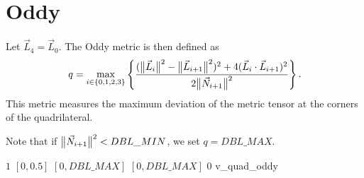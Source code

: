 \section{Oddy}

Let $\vec L_4 = \vec L_0$. The Oddy metric is then defined as
\[
q = \max_{i\in\{0,1,2,3\}}\left\{
    \frac{(\big\lVert{\vec L_i}\big\rVert^2 - \big\lVert{\vec L_{i+1}}\big\rVert^2)^2 
    + 4 (\vec L_i \cdot \vec L_{i+1})^2}
    {2 \big\lVert{\vec N_{i+1}}\big\rVert^2 }
  \right\}.
\]
This metric measures the maximum deviation of the metric tensor at the corners of the quadrilateral.

Note that if $\big\lVert{\vec N_{i+1}}\big\rVert^2 < DBL\_MIN$, we set $q = DBL\_MAX$.

%
{$1$}%
{$[0,0.5]$}%
{$[0,DBL\_MAX]$}%
{$[0,DBL\_MAX]$}%
{$0$}%
{\cite{odd:88}}%
{v\_quad\_oddy}%

